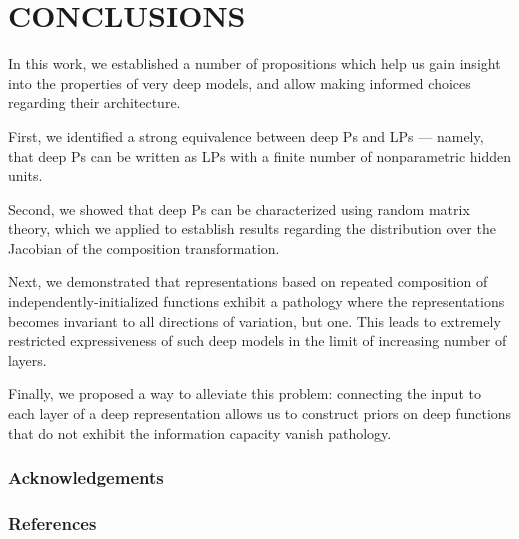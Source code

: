 \documentclass[twoside]{article}
\makeatletter
\newlength{\nonHumbleHeight}
\def\@humbleformat#1{{\settoheight{\nonHumbleHeight}{#1}\resizebox{!}{0.94\nonHumbleHeight}{#1}}}%
\def\humble#1{\@humbleformat{#1}}%
\newcommand{\gp}{{\humble GP}}
\newcommand{\MLP}{{\humble MLP}}
\newcommand{\sectiondist}{}
\makeatother
\begin{document}


\section{CONCLUSIONS}
\sectiondist

In this work, we established a number of propositions which help us gain insight into the properties of very deep models, and allow making informed choices regarding their architecture.

First, we identified a strong equivalence between deep \gp{}s and \MLP{}s --- namely, that deep \gp{}s can be written as \MLP{}s with a finite number of nonparametric hidden units. 

Second, we showed that deep \gp{}s can be characterized using random matrix theory, which we applied to establish results regarding the distribution over the Jacobian of the composition transformation.

Next, we demonstrated that representations based on repeated composition of independently-initialized functions exhibit a pathology where the representations becomes invariant to all directions of variation, but one. This leads to extremely restricted expressiveness of such deep models in the limit of increasing number of layers. 

Finally, we proposed a way to alleviate this problem: connecting the input to each layer of a deep representation allows us to construct priors on deep functions that do not exhibit the information capacity vanish pathology.


\subsubsection*{Acknowledgements}

\subsubsection*{References}
\vspace{-0.3in}
\renewcommand{\refname}{}



\end{document}

